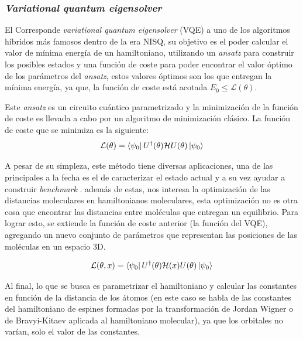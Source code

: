 \subsubsection{\textit{Variational quantum eigensolver}}
El Corresponde \textit{variational quantum eigensolver} (VQE) \cite{VQE} a uno de los algoritmos híbridos más famosos dentro de la era NISQ, su objetivo es el poder calcular el valor de mínima energía de un hamiltoniano, utilizando un \textit{ansatz} para construir los posibles estados y una función de coste para poder encontrar el valor óptimo de los parámetros del \textit{ansatz}, estos valores óptimos son los que entregan la mínima energía, ya que, la función de coste está acotada $E_0 \leq \mathcal{L}(\theta)$.

Este \textit{ansatz} es un circuito cuántico parametrizado y la minimización de la función de coste es llevada a cabo por un algoritmo de minimización clásico. La función de coste que se minimiza es la siguiente:
\begin{equation*}
    \mathcal{L}(\theta) = \bra{\psi_0}U^{\dag}(\theta)\mathcal{H}U(\theta)\ket{\psi_0}
\end{equation*}



A pesar de su simpleza, este método tiene diversas aplicaciones, una de las principales a la fecha es el de caracterizar el estado actual y a su vez ayudar a construir \textit{benchmark} \cite{McCaskey2019QCbench}. además de estas, nos interesa la optimización de las distancias moleculares en hamiltonianos moleculares\cite{OptimizationStruture}, esta optimización no es otra cosa que encontrar las distancias entre moléculas que entregan un equilibrio. Para lograr esto, se extiende la función de coste anterior (la función del VQE), agregando un nuevo conjunto de parámetros que representan las posiciones de las moléculas en un espacio 3D.

\begin{equation*}
    \mathcal{L}(\theta, x) = \bra{\psi_0}U^{\dag}(\theta)\mathcal{H}(x)U(\theta)\ket{\psi_0}
\end{equation*}

Al final, lo que se busca es parametrizar el hamiltoniano y calcular las constantes en función de la distancia de los átomos (en este caso se habla de las constantes del hamiltoniano de espines formadas por la transformación de Jordan Wigner o de Bravyi-Kitaev aplicada al hamiltoniano molecular), ya que los orbitales no varían, solo el valor de las constantes.

